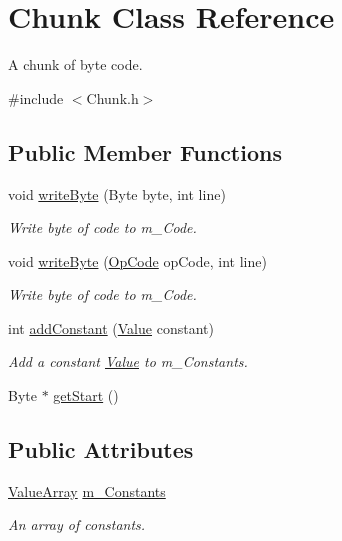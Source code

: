 \hypertarget{class_chunk}{}\section{Chunk Class Reference}
\label{class_chunk}


A chunk of byte code.  




{\ttfamily \#include $<$Chunk.\+h$>$}

\subsection*{Public Member Functions}
\begin{DoxyCompactItemize}
\item 
void \hyperlink{class_chunk_a825c5802ac179ab0aa45a2153b968f31}{write\+Byte} (Byte byte, int line)
\begin{DoxyCompactList}\small\item\em Write byte of code to m\+\_\+\+Code. \end{DoxyCompactList}\item 
void \hyperlink{class_chunk_ae829323f6890ae5eddd48dc39d46455d}{write\+Byte} (\hyperlink{_chunk_8h_a3d7c5cec8d9c1afc2c92ad39b9d64996}{Op\+Code} op\+Code, int line)
\begin{DoxyCompactList}\small\item\em Write byte of code to m\+\_\+\+Code. \end{DoxyCompactList}\item 
int \hyperlink{class_chunk_a138fc2e29b0a19f87d6c3fd7560815f8}{add\+Constant} (\hyperlink{class_value}{Value} constant)
\begin{DoxyCompactList}\small\item\em Add a constant \hyperlink{class_value}{Value} to m\+\_\+\+Constants. \end{DoxyCompactList}\item 
Byte $\ast$ \hyperlink{class_chunk_a95d10e1f1a3d246fb045e81b20c9487d}{get\+Start} ()
\end{DoxyCompactItemize}
\subsection*{Public Attributes}
\begin{DoxyCompactItemize}
\item 
\mbox{\label{class_chunk_ad22276b5bb6ac793fc3185e6fa5a6064}} 
\hyperlink{_value_8h_ad5c36ad5821e2aca06138efab8f0fc8d}{Value\+Array} \hyperlink{class_chunk_ad22276b5bb6ac793fc3185e6fa5a6064}{m\+\_\+\+Constants}
\begin{DoxyCompactList}\small\item\em An array of constants. \end{DoxyCompactList}\end{DoxyCompactItemize}
